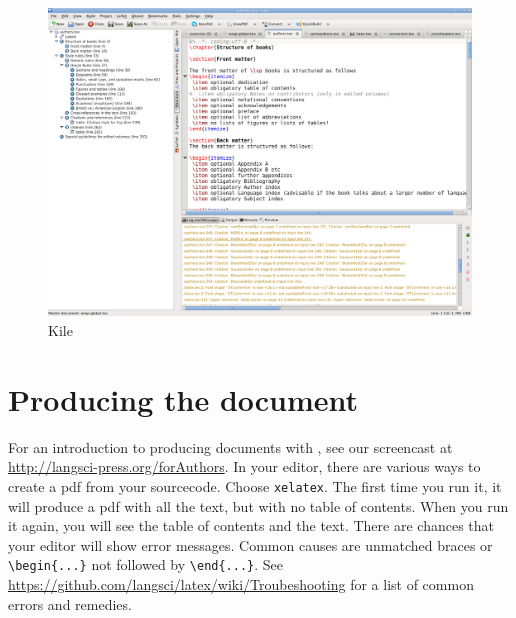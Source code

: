 \begin{figure}
\includegraphics[width=\textwidth]{kile.png}
\caption{Kile}
\label{fig:latex:kile} 
\end{figure}

  
% 
\section{Producing the document}
For an introduction to producing documents with \latex, see our screencast at \url{http://langsci-press.org/forAuthors}.
In your \latex editor, there are various ways to create a pdf from your sourcecode. Choose \verb+xelatex+. The first time you run it, it will produce a pdf with all the text, but with no table of contents. When you run it again, you will see the table of contents and the text. There are chances that your editor will show error messages. Common causes are unmatched braces or \verb+\begin{...}+ not followed by \verb+\end{...}+. See \url{https://github.com/langsci/latex/wiki/Troubeshooting} for a list of common errors and remedies.




